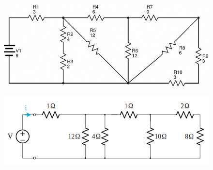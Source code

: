 \documentclass[12pt]{article}
\begin{document}
\begin{itemize}
    \begin{figure}[h!]
        \centering
        \includegraphics [scale=0.55]{circuit_2}
        \label{fig:circuit2}
    \end{figure}
    \newpage
    \vspace{-2in}
    \begin{figure}[h!]
        \centering
        \includegraphics [scale=0.75]{circuit_3}
        \label{fig:circuit3}
    \end{figure}

\end{itemize}

 
\end{document}
